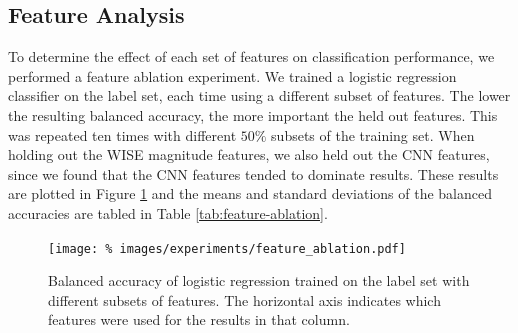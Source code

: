   \subsection{Feature Analysis}
  \label{sec:feature-analysis}

    To determine the effect of each set of features on classification
    performance, we performed a feature ablation experiment. We trained a
    logistic regression classifier on the \citeauthor{norris06} label set, each
    time using a different subset of features. The lower the resulting balanced
    accuracy, the more important the held out features. This was repeated ten
    times with different $50\%$ subsets of the training set. When holding out
    the WISE magnitude features, we also held out the CNN features, since we
    found that the CNN features tended to dominate results. These results are
    plotted in Figure \ref{fig:feature-ablation} and the means and standard
    deviations of the balanced accuracies are tabled in Table
    \ref{tab:feature-ablation}.

    \begin{figure}[!ht]
      \centering
      \texttt{[image: \%
        images/experiments/feature\_ablation.pdf]}
      \caption{Balanced accuracy of logistic regression trained on the
        \citeauthor{norris06} label set with different subsets of features. The
        horizontal axis indicates which features were used for the results in
        that column.}
      \label{fig:feature-ablation}
    \end{figure}

